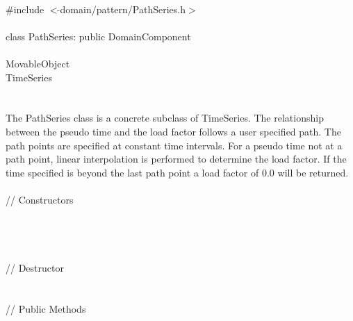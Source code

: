 
   \\
\indent \#include $<\tilde{ }$domain/pattern/PathSeries.h$>$  \\

  \\
\indent class PathSeries: public DomainComponent  \\

 \\
\indent MovableObject \\
\indent\indent TimeSeries \\
\indent\indent{} \\

 \\ 
\indent The PathSeries class is a concrete subclass of TimeSeries.
The relationship between the pseudo time and the load factor follows
a user specified path. The path points are specified at constant time
intervals. For a pseudo time not at a path point, linear interpolation
is performed to determine the load factor. If the time specified is
beyond the last path point a load factor of $0.0$ will be returned.\\

 \\
\indent // Constructors \\ 
\\ 
\\ 
\\ \\
\indent // Destructor \\ 
\\  \\
\indent // Public Methods \\ 
\\
\\
\\
\\

